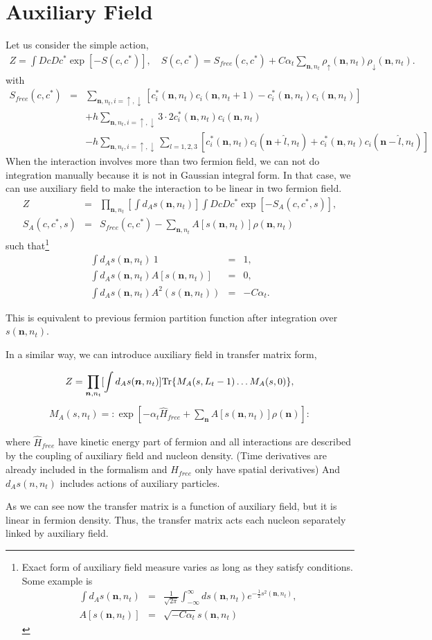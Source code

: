 \documentclass[10pt]{book}
\def\bm{\boldsymbol}
\newcommand{\bea}{\begin{eqnarray}}
\newcommand{\eea}{\end{eqnarray}}
\newcommand{\no}{\nonumber \\}
\def\vn{{\bm n}}
\begin{document}
\section{Auxiliary Field}
Let us consider the simple action,
\bea 
Z=\int Dc Dc^* \exp[-S(c,c^*)],\quad 
S(c,c^*)=S_{free}(c,c^*)+C\alpha_t\sum_{\vn,n_t}
 \rho_\uparrow(\vn,n_t)\rho_\downarrow(\vn,n_t).
\eea 
with
\bea
S_{free}(c,c^*)&=&\sum_{\vn,n_t,i=\uparrow,\downarrow}
 [c_i^*(\vn,n_t)c_i(\vn,n_t+1)-c_i^*(\vn,n_t)c_i(\vn,n_t)]
 \no & &
 +h \sum_{\vn,n_t,i=\uparrow,\downarrow} 3\cdot 2 c_i^*(\vn,n_t)c_i(\vn,n_t)
 \no & &
 -h \sum_{\vn,n_t,i=\uparrow,\downarrow}\sum_{l=1,2,3}
 [c_i^*(\vn,n_t)c_i(\vn+\hat{l},n_t)+c_i^*(\vn,n_t)c_i(\vn-\hat{l},n_t)]
\eea
When the interaction involves more than two fermion field, 
we can not do integration manually because it is not in Gaussian integral form. 
In that case, we can use auxiliary field to make the interaction to be 
linear in two fermion field. 
\bea 
Z&=&\prod_{\vn,n_t}\left[\int d_A s(\vn,n_t) \right]
     \int Dc Dc^* \exp[-S_A(c,c^*,s)],\no 
S_A(c,c^*,s)&=& S_{free}(c,c^*)-\sum_{\vn,n_t} A[s(\vn,n_t)]\rho(\vn,n_t)
\eea 
such that\footnote{ Exact form of auxiliary field measure
varies as long as they satisfy conditions.  
Some example is
\bea 
\int d_A s(\vn,n_t)
&=&\frac{1}{\sqrt{2\pi}}\int_{-\infty}^{\infty} ds(\vn,n_t) e^{-\frac{1}{2}s^2(\vn,n_t)},\no 
A[s(\vn,n_t)]&=&\sqrt{-C\alpha_t} s(\vn,n_t)
\eea 

}
\bea 
\int d_A s(\vn,n_t)\ 1 &=& 1,\no 
\int d_A s(\vn,n_t) A[s(\vn,n_t)]&=&0, \no 
\int d_A s(\vn,n_t) A^2(s(\vn,n_t))&=& -C \alpha_t.
\eea 

This is equivalent to previous fermion partition function after integration over $s(\vn,n_t)$.

In a similar way, we can introduce auxiliary field in transfer matrix form,
\begin{framed}	
\bea 
Z=\prod_{\vn,n_t}[\int d_A s(\vn,n_t)]{\rm Tr}\{ M_A(s,L_t-1)\dots M_A(s,0)   \}, 
\eea 
\bea 
M_A(s,n_t)=:\exp\left[-\alpha_t \hat{H}_{free}+\sum_{\vn} A[s(\vn,n_t)] \rho(\vn) \right]:
\eea 
\end{framed}
where $\hat{H}_{free}$ have kinetic energy part of fermion and all interactions are
described by the coupling of auxiliary field and nucleon density. 
(Time derivatives are already included in the formalism 
and $\hat{H}_{free}$ only have spatial derivatives) 
And $d_A s(n,n_t)$ includes actions of auxiliary particles. 

As we can see now the transfer matrix is a function of auxiliary field, but
it is linear in fermion density. Thus, the transfer matrix acts each nucleon
separately linked by auxiliary field. 
\end{document}
